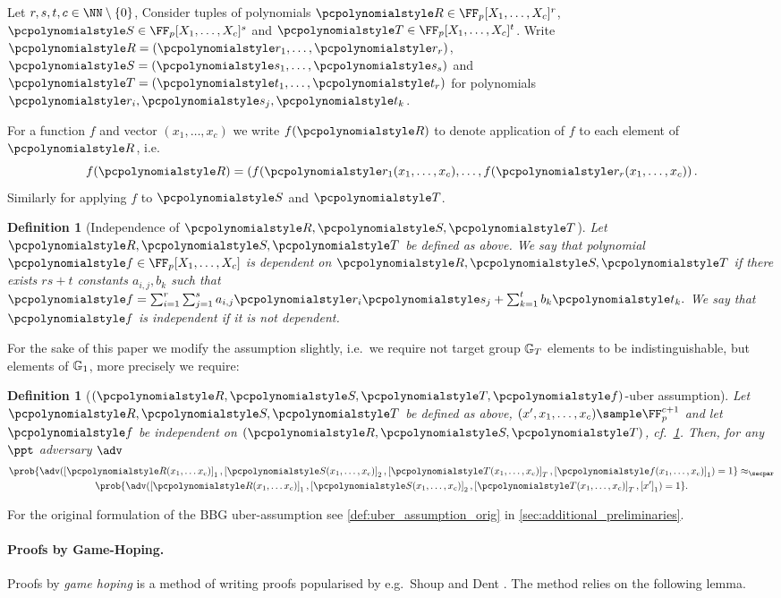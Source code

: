 \let\accentvec\vec \documentclass[runningheads]{llncs}
\newtheorem{definition}[theorem]{Definition}
\begin{document}
Let $r, s, t, c \in \NN \setminus \smallset{0}$, Consider tuples of polynomials
$\pR \in \FF_p[X_1, \ldots, X_c]^r$, $\pS \in \FF_p[X_1, \ldots, X_c]^s$ and
$\pT \in \FF_p[X_1, \ldots, X_c]^t$. Write $\pR = \left( \p{r}_1, \ldots,
  \p{r}_r \right)$, $\pS = \left( \p{s}_1, \ldots, \p{s}_s \right)$ and $\pT =
\left( \p{t}_1, \ldots, \p{t}_r \right)$ for polynomials $\p{r}_i, \p{s}_j,
\p{t}_k$.

For a function $f$ and vector $(x_1, \ldots, x_c)$ we write $f(\pR)$ to
denote application of $f$ to each element of $\pR$, i.e.
\[
	f(\pR) = \left( f(\p{r}_1 (x_1, \ldots, x_c), \ldots, f(\p{r}_r
	(x_1, \ldots, x_c) \right).
\]
Similarly for applying $f$ to $\pS$ and $\pT$.

\begin{definition}[Independence of $\pR, \pS, \pT$]
	\label{def:independence}
	Let $\pR, \pS, \pT$ be defined as above. We say that polynomial $\p{f} \in
  \FF_p[X_1, \ldots, X_c]$ is \emph{dependent} on $\pR, \pS, \pT$ if there
  exists $rs + t$ constants $a_{i, j}, b_k$ such that $ \p{f} = \sum_{i = 1}^{r}
  \sum_{j = 1}^{s} a_{i, j} \p{r}_i \p{s}_j + \sum_{k = 1}^{t} b_k \p{t}_k. $ We
  say that $\p{f}$ is \emph{independent} if it is not dependent.
\end{definition}


For the sake of this paper we modify the assumption slightly, i.e.~we require
not target group $\mathbb{G}_T$ elements to be indistinguishable, but elements of
$\mathbb{G}_1$, more precisely we require: 

\begin{definition}[$(\pR, \pS, \pT, \p{f})$-uber assumption]
	\label{def:uber_assumption}
	Let $\pR, \pS, \pT$ be defined as above, $(x', x_1, \ldots, x_c) \sample \FF_p^{c + 1}$ and let
	$\p{f}$ be independent on $(\pR, \pS, \pT)$, cf.~\cref{def:independence}.
	Then, for any $\ppt$ adversary $\adv$
	\begin{multline*}
		\prob{\adv(\gone{\pR(x_1, \ldots x_c)}, \gtwo{\pS(x_1, \ldots, x_c)},
		\gtar{\pT(x_1, \ldots, x_c)}, \gone{\p{f}(x_1, \ldots, x_c)}) = 1} \approx_\secpar \\ 
		\prob{\adv(\gone{\pR(x_1, \ldots x_c)}, \gtwo{\pS(x_1, \ldots, x_c)},
		\gtar{\pT(x_1, \ldots, x_c)}, \gone{x'}) = 1}.  
	\end{multline*}
\end{definition}
For the original formulation of the BBG uber-assumption see
\cref{def:uber_assumption_orig} in \cref{sec:additional_preliminaries}.
\paragraph{Proofs by Game-Hoping.}
Proofs by \emph{game hoping} is a method of writing proofs popularised by
e.g.~Shoup \cite{EPRINT:Shoup04} and Dent \cite{EPRINT:Dent06c}. The method
relies on the following lemma.
\end{document}
